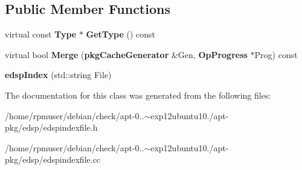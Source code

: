 \subsection*{\-Public \-Member \-Functions}
\begin{DoxyCompactItemize}
\item 
virtual const {\bf \-Type} $\ast$ {\bfseries \-Get\-Type} () const \label{classedspIndex_a97e9791ce2bb129d7b03dfe2f55de366}

\item 
virtual bool {\bfseries \-Merge} ({\bf pkg\-Cache\-Generator} \&\-Gen, {\bf \-Op\-Progress} $\ast$\-Prog) const \label{classedspIndex_a7055ce0e05b5bcf6fad25971d5e3c9e4}

\item 
{\bfseries edsp\-Index} (std\-::string \-File)\label{classedspIndex_a859ad8ca7af9b471313247617bbe97b1}

\end{DoxyCompactItemize}


\-The documentation for this class was generated from the following files\-:\begin{DoxyCompactItemize}
\item 
/home/rpmuser/debian/check/apt-\/0..$\sim$exp12ubuntu10./apt-\/pkg/edsp/edspindexfile.\-h\item 
/home/rpmuser/debian/check/apt-\/0..$\sim$exp12ubuntu10./apt-\/pkg/edsp/edspindexfile.\-cc\end{DoxyCompactItemize}
